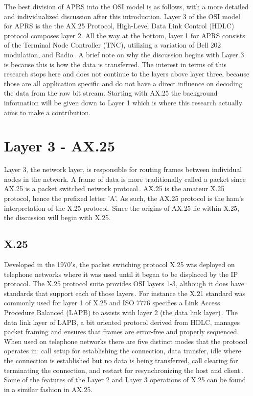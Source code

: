The best division of APRS into the OSI model is as follows, with a more detailed and individualized discussion after this introduction. Layer 3 of the OSI model for APRS is the the AX.25 Protocol,  High-Level Data Link Control (HDLC) protocol composes layer 2. All the way at the bottom, layer 1 for APRS consists of the Terminal Node Controller (TNC), utilizing a variation of Bell 202 modulation, and Radio\,\cite{Silver2013}. A brief note on why the discussion begins with Layer 3 is because this is how the data is transferred. The interest in terms of this research stops here and does not continue to the layers above layer three, because those are all application specific and do not have a direct influence on decoding the data from the raw bit stream. Starting with AX.25 the background information will be given down to Layer 1 which is where this research actually aims to make a contribution.

\section{Layer 3 - AX.25}
Layer 3, the network layer, is responsible for routing frames between individual nodes in the network. A frame of data is more traditionally called a packet since AX.25 is a packet switched network protocol\,\cite{Peterson2011}. AX.25 is the amateur X.25 protocol, hence the prefixed letter 'A'. As such, the AX.25 protocol is the ham's interpretation of the X.25 protocol. Since the origins of AX.25 lie within X.25, the discussion will begin with X.25. 

\subsection{X.25}
Developed in the 1970's, the packet switching protocol X.25 was deployed on telephone networks where it was used until it began to be displaced by the IP protocol. The X.25 protocol suite provides OSI layers 1-3, although it does have standards that support each of those layers\,\cite{Sosinsky2009}. For instance the X.21 standard was commonly used for layer 1 of X.25 and ISO 7776 specifies a Link Access Procedure Balanced (LAPB) to assists with layer 2 (the data link layer)\,\cite{Gallagher1997}. The data link layer of LAPB, a bit oriented protocol derived from HDLC,  manages packet framing and ensures that frames are error-free and properly sequenced. When used on telephone networks there are five distinct modes that the protocol operates in: call setup for establishing the connection, data transfer, idle where the connection is established but no data is being transferred, call clearing for terminating the connection, and restart for resynchronizing the host and client\,\cite{Javvin2006}. Some of the features of the Layer 2 and Layer 3 operations of X.25 can be found in a similar fashion in AX.25.

